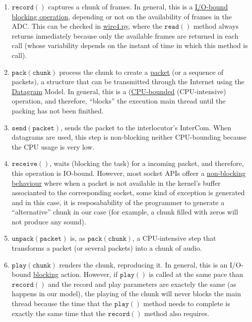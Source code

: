 \begin{enumerate}
\item $\mathtt{record()}$ captures a chunk of frames. In general, this
  is a \href{https://en.wikipedia.org/wiki/I/O_bound}{I/O-bound}
  \href{https://python-sounddevice.readthedocs.io/en/0.4.0/api/streams.html#sounddevice.Stream.read}{blocking
    operation}, depending or not on the availability of frames in the
  ADC. This can be checked in
  \href{https://raw.githubusercontent.com/Tecnologias-multimedia/intercom/master/test/sounddevice/wire4.py}{wire4.py},
  where the $\mathtt{read()}$ method always returns inmediately
  because only the available frames are returned in each call (whose
  variability depends on the instant of time in which this method is
  call).
\item $\mathtt{pack(chunk)}$ process the chunk to create a
  \href{https://en.wikipedia.org/wiki/Network_packet}{packet} (or a
  sequence of packets), a structure that can be transmitted through
  the Internet using the
  \href{https://en.wikipedia.org/wiki/Datagram}{Datagram} Model. In
  general, this is a
  (\href{https://en.wikipedia.org/wiki/CPU-bound}{CPU-bounded}
  (CPU-intensive) operation, and therefore, ``blocks'' the execution
  main thread until the packing has not been finithed.
\item $\mathtt{send(packet)}$, sends the packet to the
  interlocutor's InterCom. When datagrams are used, this step is
  non-blocking neither CPU-bounding because the
  CPU usage is very low.
\item $\mathtt{receive()}$, waits (blocking the task) for a incoming
  packet, and therefore, this operation is IO-bound. However, most
  socket APIs offeer a
  \href{https://docs.python.org/3.8/library/socket.html#socket.socket.setblocking}{non-blocking
    behaviour} where when a packet is not available in the kernel's
  buffer associanted to the corresponding socket, some kind of
  exception is generated and in this case, it is resposabability of
  the programmer to generate a ``alternative'' chunk in our case (for
  example, a chunk filled with zeros will not produce any sound).
\item $\mathtt{unpack(packet)}$ is, as $\mathtt{pack(chunk)}$, a
  CPU-intensive step that transforms a packet (or several packets)
  into a chunk of audio.
\item $\mathtt{play(chunk)}$ renders the chunk, reproducing it. In
  general, this is an I/O-bound
  \href{https://python-sounddevice.readthedocs.io/en/0.4.0/api/streams.html#sounddevice.Stream.write}{blocking}
  action. However, if $\mathtt{play()}$ is called at the same pace
  than $\mathtt{record()}$ and the record and play parameters are
  exactely the same (as happens in our model), the playing of the
  chunk will never blocks the main thread because the time that the
  $\mathtt{play()}$ method needs to complete is exactly the same time
  that the $\mathtt{record()}$ method also requires.
\end{enumerate}

